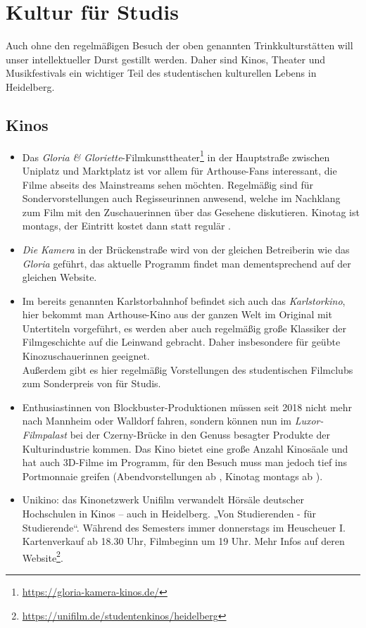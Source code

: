 
\section{Kultur für Studis}

Auch ohne den regelmäßigen Besuch der oben genannten Trinkkulturstätten will unser intellektueller Durst gestillt werden. Daher sind Kinos, Theater und Musikfestivals ein wichtiger Teil des studentischen kulturellen Lebens in Heidelberg.

\subsection{Kinos}
\begin{itemize}
\item Das \emph{Gloria \& Gloriette}-Filmkunsttheater\footnote{\label{gloria-gloriette-film} \url{https://gloria-kamera-kinos.de/}} in der Hauptstraße zwischen Uniplatz und Marktplatz ist vor allem für Arthouse-Fans interessant, die Filme abseits des Mainstreams sehen möchten. Regelmäßig sind für Sondervorstellungen auch Regisseurinnen anwesend, welche im Nachklang zum Film mit den Zuschauerinnen über das Gesehene diskutieren. Kinotag ist montags, der Eintritt kostet dann  statt regulär .
\item \emph{Die Kamera} in der Brückenstraße wird von der gleichen Betreiberin wie das \emph{Gloria} geführt, das aktuelle Programm findet man dementsprechend auf der gleichen Website.
\item Im bereits genannten Karlstorbahnhof befindet sich auch das \emph{Karlstorkino}, hier bekommt man Arthouse-Kino aus der ganzen Welt im Original mit Untertiteln vorgeführt, es werden aber auch regelmäßig große Klassiker der Filmgeschichte auf die Leinwand gebracht. Daher insbesondere für geübte Kinozuschauerinnen geeignet.\\
Außerdem gibt es hier regelmäßig Vorstellungen des studentischen Filmclubs zum Sonderpreis von  für Studis.
\item Enthusiastinnen von Block\-bus\-ter-Pro\-duk\-tio\-nen müssen seit 2018 nicht mehr nach Mannheim oder Walldorf fahren, sondern können nun im \emph{Luxor-Filmpalast} bei der Czerny-Brücke in den Genuss besagter Produkte der Kulturindustrie kommen. Das Kino bietet eine große Anzahl Kinosäale und hat auch 3D-Filme im Programm, für den Besuch muss man jedoch tief ins Portmonnaie greifen (Abendvorstellungen ab , Kinotag montags ab ).
\item Unikino: das Kinonetzwerk Unifilm verwandelt Hörsäle deutscher Hochschulen in Kinos -- auch in Heidelberg. „Von Studierenden - für Studierende“. Während des Semesters immer donnerstags im Heuscheuer I. Kartenverkauf ab 18.30 Uhr, Filmbeginn um 19 Uhr. Mehr Infos auf deren Website\footnote{\url{https://unifilm.de/studentenkinos/heidelberg}}.
\end{itemize}

